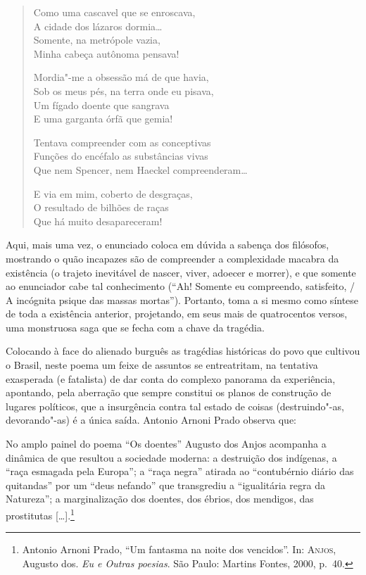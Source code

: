 \begin{verse}
Como uma cascavel que se enroscava,\\
A cidade dos lázaros dormia\ldots{}\\
Somente, na metrópole vazia,\\
Minha cabeça autônoma pensava!

Mordia"-me a obsessão má de que havia,\\
Sob os meus pés, na terra onde eu pisava,\\
Um fígado doente que sangrava\\
E uma garganta órfã que gemia!

Tentava compreender com as conceptivas\\
Funções do encéfalo as substâncias vivas\\
Que nem Spencer, nem Haeckel compreenderam\ldots{}

E via em mim, coberto de desgraças,\\
O resultado de bilhões de raças\\
Que há muito desapareceram!
\end{verse}

Aqui, mais uma vez, o enunciado coloca em dúvida a sabença dos
filósofos, mostrando o quão incapazes são de compreender a complexidade
macabra da existência (o trajeto inevitável de nascer, viver, adoecer e
morrer), e que somente ao enunciador cabe tal conhecimento
(“Ah! Somente eu compreendo, satisfeito, / A incógnita psique das
massas mortas”). Portanto, toma a si mesmo como síntese de toda a
existência anterior, projetando, em seus mais de quatrocentos versos,
uma monstruosa saga que se fecha com a chave da tragédia. 

Colocando à face do alienado burguês as tragédias históricas do povo
que cultivou o Brasil, neste poema um feixe de assuntos se
entreatritam, na tentativa exasperada (e fatalista) de dar conta do
complexo panorama da experiência, apontando, pela aberração que sempre
constitui os planos de construção de lugares políticos, que a
insurgência contra tal estado de coisas (destruindo"-as, devorando"-as) é
a única saída. Antonio Arnoni Prado observa que:

\begin{hedraquote}
No amplo painel do poema “Os doentes” Augusto dos Anjos acompanha a
dinâmica de que resultou a sociedade moderna: a destruição dos
indígenas, a “raça esmagada pela Europa”; a “raça negra” atirada ao
“contubérnio diário das quitandas” por um “deus nefando” que
transgrediu a “igualitária regra da Natureza”; a marginalização dos
doentes, dos ébrios, dos mendigos, das prostitutas [\ldots{}].\footnote{Antonio 
Arnoni Prado, “Um fantasma na noite dos vencidos”. In: \textsc{Anjos}, Augusto dos. 
\textit{Eu e Outras poesias}. São Paulo: Martins Fontes, 2000, p.~40.}
\end{hedraquote}

